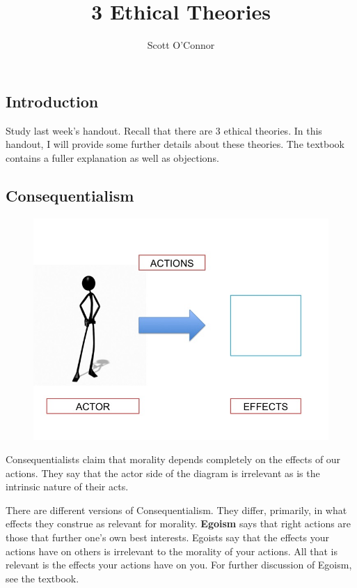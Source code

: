 \documentclass[9pt]{article}
\title{3 Ethical Theories}
\author{Scott O'Connor}
\begin{document}
\maketitle


\subsection{Introduction}\label{introduction}

Study last week's handout. Recall that there are 3 ethical theories. In
this handout, I will provide some further details about these theories.
The textbook contains a fuller explanation as well as objections.

\subsection{Consequentialism}\label{consequentialism}

\begin{figure}[htbp]
\centering
\includegraphics{Slide1.jpg}
\end{figure}

Consequentialists claim that morality depends completely on the effects
of our actions. They say that the actor side of the diagram is
irrelevant as is the intrinsic nature of their acts.

There are different versions of Consequentialism. They differ,
primarily, in what effects they construe as relevant for morality.
\textbf{Egoism} says that right actions are those that further one's own
best interests. Egoists say that the effects your actions have on others
is irrelevant to the morality of your actions. All that is relevant is
the effects your actions have on you. For further discussion of Egoism,
see the textbook.
\end{document}

